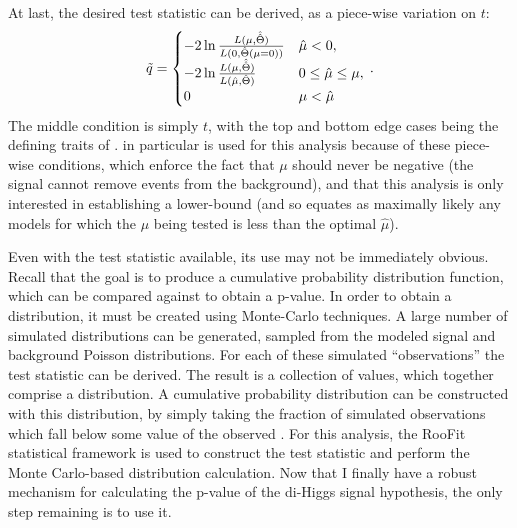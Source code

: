     At last, the desired test statistic \qtil can be derived, as a piece-wise variation on $t$\cite{asymptotic_formulae_for_likelihood}:
    \begin{equation}
        \tilde{q} = \begin{cases}
            -2 \ln{\frac{L(\mu, \hat {\hat \Theta})}{L(0, \hat \Theta(\mu=0))}} & \hat \mu < 0,\\
            -2 \ln{\frac{L(\mu, \hat {\hat \Theta})}{L(\hat \mu, \hat \Theta)}} & 0 \leq \hat \mu \leq \mu,\\
            0 & \mu < \hat \mu 
        \end{cases}
        \,.
    \end{equation}
    The middle condition is simply $t$, with the top and bottom edge cases being the defining traits of \qtil.
    \qtil in particular is used for this analysis because of these piece-wise conditions,
        which enforce the fact that $\mu$ should never be negative
        (the signal cannot remove events from the background),
        and that this analysis is only interested in establishing a lower-bound
        (and so equates as maximally likely any models for which the $\mu$ being tested is less than the optimal $\hat\mu$).

    Even with the test statistic \qtil available, its use may not be immediately obvious.
    Recall that the goal is to produce a cumulative probability distribution function,
        which can be compared against to obtain a p-value.
    In order to obtain a distribution, it must be created using Monte-Carlo techniques.
    A large number of simulated distributions can be generated,
        sampled from the modeled signal and background Poisson distributions.
    For each of these simulated ``observations'' the test statistic \qtil can be derived.
    The result is a collection of \qtil values, which together comprise a distribution.
    A cumulative probability distribution can be constructed with this distribution,
        by simply taking the fraction of simulated observations which fall below some value of the observed \qtil.
    For this analysis, the RooFit statistical framework is used to construct the test statistic and perform the
        Monte Carlo-based distribution calculation.
    Now that I finally have a robust mechanism for calculating the p-value of the di-Higgs signal hypothesis,
        the only step remaining is to use it.

